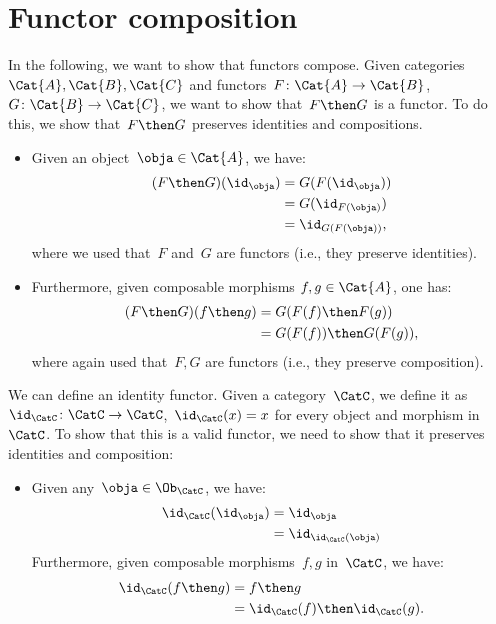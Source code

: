  
\section{Functor composition}


In the following, we want to show that functors compose.
Given categories~$\Cat{A},\Cat{B},\Cat{C}$ and functors~$F\colon \Cat{A}\to \Cat{B}$,~$G\colon \Cat{B}\to \Cat{C}$, we want to show that~$F\then G$ is a functor. To do this, we show that~$F\then G$ preserves identities and compositions. 
\begin{itemize}
    \item Given an object~$\obja\in \Cat{A}$, we have:
    \begin{equation*}
        \begin{aligned}
            (F\then G)(\id_\obja)&=G(F(\id_\obja))\\
            &=G(\id_{F(\obja)})\\
            &=\id_{G(F(\obja))},
        \end{aligned}
    \end{equation*}
    where we used that~$F$ and~$G$ are functors (i.e., they preserve identities).
    \item Furthermore, given composable morphisms $f,g\in \Cat{A}$, one has:
    \begin{equation*}
        \begin{aligned}
            (F\then G)(f\then g)&=G(F(f)\then F(g))\\
            &=G(F(f))\then G(F(g)),
        \end{aligned}
    \end{equation*}
    where again used that~$F,G$ are functors (i.e., they preserve composition).
\end{itemize}


We can define an identity functor. Given a category~$\CatC$, we define it as~$\id_\CatC\colon \CatC \to \CatC$,~$\id_\CatC(x)=x$ for every object and morphism in~$\CatC$. To show that this is a valid functor, we need to show that it preserves identities and composition:
\begin{itemize}
    \item Given any~$\obja \in \Ob_\CatC$, we have:
    \begin{equation*}
        \begin{aligned}
            \id_\CatC(\id_\obja)&=\id_\obja\\
            &=\id_{\id_\CatC(\obja)}
        \end{aligned}
    \end{equation*}
    Furthermore, given composable morphisms~$f,g$ in~$\CatC$, we have:
    \begin{equation*}
    \begin{aligned}
        \id_{\CatC}(f\then g)&=f\then g\\
        &=\id_{\CatC}(f)\then \id_{\CatC} (g).
    \end{aligned}
    \end{equation*}
\end{itemize}

